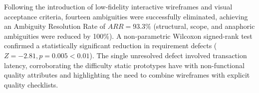 Following the introduction of low-fidelity interactive wireframes and visual acceptance criteria, fourteen ambiguities were successfully eliminated, achieving an Ambiguity Resolution Rate of $ARR = 93.3\%$ (structural, scope, and anaphoric ambiguities were reduced by 100\%). A non-parametric Wilcoxon signed-rank test confirmed a statistically significant reduction in requirement defects ($Z = -2.81, p = 0.005 < 0.01$). The single unresolved defect involved transaction latency, corroborating the difficulty static prototypes have with non-functional quality attributes \cite{rueda2020requirements} and highlighting the need to combine wireframes with explicit quality checklists.

